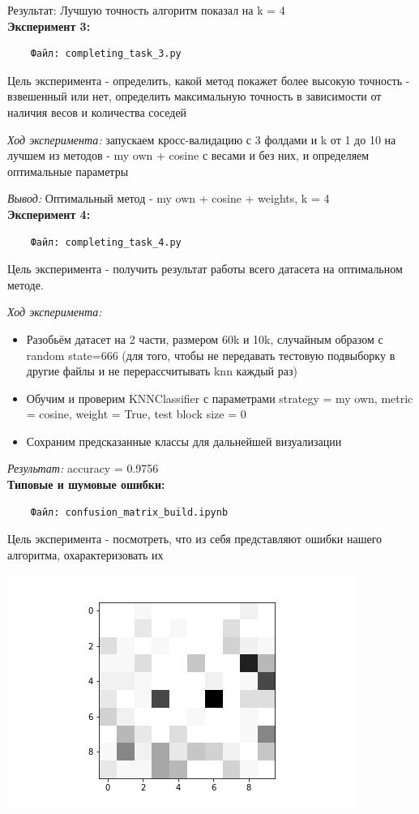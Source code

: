 \documentclass{article}
\begin{document}
Результат: Лучшую точность алгоритм показал на k = 4 \\

\textbf{\Large Эксперимент 3:} \\
\begin{verbatim}
    Файл: completing_task_3.py
\end{verbatim}
Цель эксперимента - определить, какой метод покажет более высокую точность - взвешенный или нет, определить максимальную точность в зависимости от наличия весов и количества соседей

\textit{Ход эксперимента: } запускаем кросс-валидацию с 3 фолдами и k от 1 до 10 на лучшем из методов - my own + cosine с весами и без них, и определяем оптимальные параметры

\textit{Вывод: } Оптимальный метод - my own + cosine + weights, k = 4 \\

\textbf{\Large Эксперимент 4:} \\
\begin{verbatim}
    Файл: completing_task_4.py
\end{verbatim}
Цель эксперимента - получить результат работы всего датасета на оптимальном методе.

\textit{Ход эксперимента: }\begin{itemize}
    \item Разобьём датасет на 2 части, размером 60k и 10k, случайным образом с random state=666 (для того, чтобы не передавать тестовую подвыборку в другие файлы и не перерассчитывать knn каждый раз)
    \item Обучим и проверим KNNClassifier с параметрами strategy = my own, metric = cosine, weight = True, test block size = 0
    \item Сохраним предсказанные классы для дальнейшей визуализации
\end{itemize}

\textit{Результат: } accuracy = 0.9756 \\

\textbf{\Large Типовые и шумовые ошибки:} \\
\begin{verbatim}
    Файл: confusion_matrix_build.ipynb
\end{verbatim}
Цель эксперимента - посмотреть, что из себя представляют ошибки нашего алгоритма, охарактеризовать их

\includegraphics{error_map}
\end{document}
